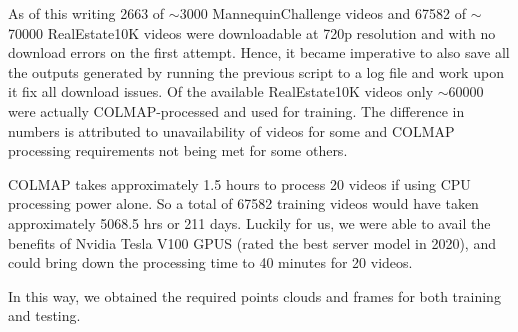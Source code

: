 As of this writing 2663 of $\sim$3000 MannequinChallenge videos and 67582 of $\sim$70000 RealEstate10K videos were downloadable at 720p resolution and with no download errors on the first attempt. Hence, it became imperative to also save all the outputs generated by running the previous script to a log file and work upon it fix all download issues. Of the available RealEstate10K videos only $\sim$60000 were actually COLMAP-processed and used for training. The difference in numbers is attributed to unavailability of videos for some and COLMAP processing requirements not being met for some others.
    
COLMAP takes approximately 1.5 hours to process 20 videos if using CPU processing power alone. So a total of 67582 training videos would have taken approximately 5068.5 hrs or 211 days. Luckily for us, we were able to avail the benefits of Nvidia Tesla V100 GPUS (rated the best server model in 2020), and could bring down the processing time to 40 minutes for 20 videos.
    
In this way, we obtained the required points clouds and frames for both training and testing.










